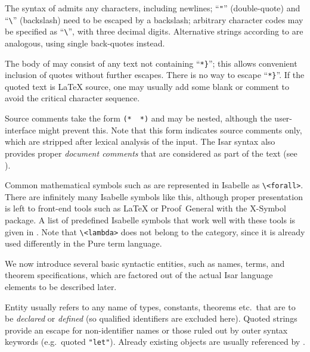 \begin{isabellebody}
\begin{isamarkuptext}
  The syntax of \hyperlink{syntax.string}{\mbox{}} admits any characters, including
  newlines; ``\verb|"|'' (double-quote) and ``\verb|\|'' (backslash) need to be escaped by a backslash; arbitrary
  character codes may be specified as ``\verb|\|'',
  with three decimal digits.  Alternative strings according to
  \hyperlink{syntax.altstring}{\mbox{}} are analogous, using single back-quotes
  instead.

  The body of \hyperlink{syntax.verbatim}{\mbox{}} may consist of any text not
  containing ``\verb|*|\verb|}|''; this allows
  convenient inclusion of quotes without further escapes.  There is no
  way to escape ``\verb|*|\verb|}|''.  If the quoted
  text is {\LaTeX} source, one may usually add some blank or comment
  to avoid the critical character sequence.

  Source comments take the form \verb|(*|~~\verb|*)| and may be nested, although the user-interface
  might prevent this.  Note that this form indicates source comments
  only, which are stripped after lexical analysis of the input.  The
  Isar syntax also provides proper \emph{document comments} that are
  considered as part of the text (see ).

  Common mathematical symbols such as  are represented in
  Isabelle as \verb|\<forall>|.  There are infinitely many Isabelle
  symbols like this, although proper presentation is left to front-end
  tools such as {\LaTeX} or Proof~General with the X-Symbol package.
  A list of predefined Isabelle symbols that work well with these
  tools is given in .  Note that \verb|\<lambda>|
  does not belong to the  category, since it is already
  used differently in the Pure term language.%
\end{isamarkuptext}%
\isamarkuptrue%
%
\isamarkuptrue%
%
\begin{isamarkuptext}%
We now introduce several basic syntactic entities, such as names,
  terms, and theorem specifications, which are factored out of the
  actual Isar language elements to be described later.%
\end{isamarkuptext}%
\isamarkuptrue%
%
\isamarkuptrue%
%
\begin{isamarkuptext}%
Entity \hyperlink{syntax.name}{\mbox{}} usually refers to any name of types,
  constants, theorems etc.\ that are to be \emph{declared} or
  \emph{defined} (so qualified identifiers are excluded here).  Quoted
  strings provide an escape for non-identifier names or those ruled
  out by outer syntax keywords (e.g.\ quoted \verb|"let"|).
  Already existing objects are usually referenced by \hyperlink{syntax.nameref}{\mbox{}}.


\end{isamarkuptext}
\end{isabellebody}
